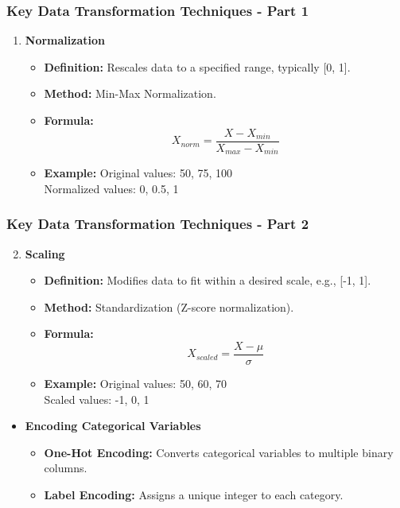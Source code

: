 \documentclass{beamer}
\begin{document}
\begin{frame}[fragile]
    \frametitle{Key Data Transformation Techniques - Part 1}
    \begin{enumerate}
        \item \textbf{Normalization}
            \begin{itemize}
                \item \textbf{Definition:} Rescales data to a specified range, typically [0, 1].
                \item \textbf{Method:} Min-Max Normalization.
                \item \textbf{Formula:}
                    \begin{equation}
                        X_{norm} = \frac{X - X_{min}}{X_{max} - X_{min}}
                    \end{equation}
                \item \textbf{Example:} 
                    Original values: 50, 75, 100 \\
                    Normalized values: 0, 0.5, 1
            \end{itemize}
    \end{enumerate}
\end{frame}

\begin{frame}[fragile]
    \frametitle{Key Data Transformation Techniques - Part 2}
    \begin{enumerate}
        \setcounter{enumi}{1} %
        \item \textbf{Scaling}
            \begin{itemize}
                \item \textbf{Definition:} Modifies data to fit within a desired scale, e.g., [-1, 1].
                \item \textbf{Method:} Standardization (Z-score normalization).
                \item \textbf{Formula:}
                    \begin{equation}
                        X_{scaled} = \frac{X - \mu}{\sigma}
                    \end{equation}
                \item \textbf{Example:} 
                    Original values: 50, 60, 70 \\
                    Scaled values: -1, 0, 1
            \end{itemize}
    \end{enumerate}

    \begin{itemize}
        \item \textbf{Encoding Categorical Variables}
            \begin{itemize}
                \item \textbf{One-Hot Encoding:} Converts categorical variables to multiple binary columns.
                \item \textbf{Label Encoding:} Assigns a unique integer to each category.
            \end{itemize}
    \end{itemize}
\end{frame}
\end{document}
